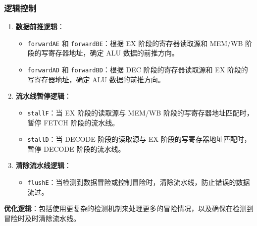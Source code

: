\subsubsection{逻辑控制}
\begin{enumerate}
    \item \textbf{数据前推逻辑}：
    \begin{itemize}
        \item \texttt{forwardAE} 和 \texttt{forwardBE}：根据 EX 阶段的寄存器读取源和 MEM/WB 阶段的写寄存器地址，确定 ALU 数据的前推方向。
        \item \texttt{forwardAD} 和 \texttt{forwardBD}：根据 DEC 阶段的寄存器读取源和 EX 阶段的写寄存器地址，确定 ALU 数据的前推方向。
    \end{itemize}

    \item \textbf{流水线暂停逻辑}：
    \begin{itemize}
        \item \texttt{stallF}：当 EX 阶段的读取源与 MEM/WB 阶段的写寄存器地址匹配时，暂停 FETCH 阶段的流水线。
        \item \texttt{stallD}：当 DECODE 阶段的读取源与 EX 阶段的写寄存器地址匹配时，暂停 DECODE 阶段的流水线。
    \end{itemize}

    \item \textbf{清除流水线逻辑}：
    \begin{itemize}
        \item \texttt{flushE}：当检测到数据冒险或控制冒险时，清除流水线，防止错误的数据流过。
    \end{itemize}
    
\end{enumerate}

\textbf{优化逻辑}：包括使用更复杂的检测机制来处理更多的冒险情况，以及确保在检测到冒险时及时清除流水线。
